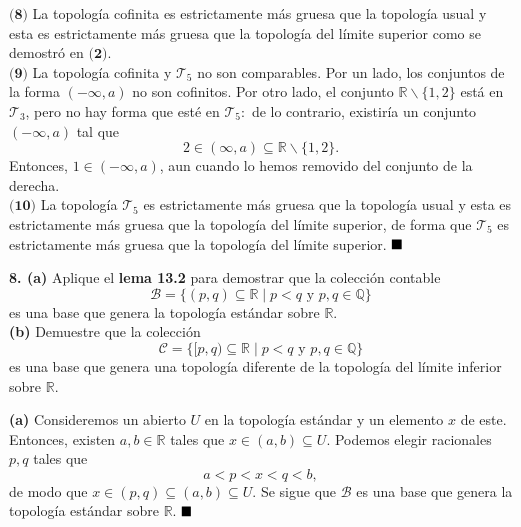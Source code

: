 \documentclass{article}
\begin{document}
$\textbf{(8)}$ La topología cofinita es estrictamente más gruesa que la topología usual y esta es estrictamente más gruesa que la topología del límite superior como se demostró en $\textbf{(2)}$.\\ 
\newpage
$\textbf{(9)}$ La topología cofinita y $\mathcal{T}_{5}$ no son comparables. Por un lado, los conjuntos de la forma $(- \infty, a)$ no son cofinitos. Por otro lado, el conjunto $\mathbb{R} \backslash \{ 1, 2\}$ está en $\mathcal{T}_{3}$, pero no hay forma que esté en $\mathcal{T}_{5}: $ de lo contrario, existiría un conjunto $(-\infty, a)$ tal que
$$  2 \in (\infty, a) \subseteq \mathbb{R} \backslash \{1, 2 \}.$$ 
Entonces, $1 \in (- \infty, a)$, aun cuando lo hemos removido del conjunto de la derecha. \\

$\textbf{(10)}$ La topología $\mathcal{T}_{5}$ es estrictamente más gruesa que la topología usual y esta es estrictamente más gruesa que la topología del límite superior, de forma que $\mathcal{T}_{5}$ es estrictamente más gruesa que la topología del límite superior. $\hspace*{\fill} \blacksquare$\\
 

\begin{mybox}
\textbf{8. (a)} Aplique el \textbf{lema 13.2} para demostrar que la colección contable 
$$ \mathcal{B} = \{ (p, q) \subseteq \mathbb{R} \mid p < q \text{ y } p, q \in \mathbb{Q} \} $$
es una base que genera la topología estándar sobre $\mathbb{R}$.	\\

\textbf{(b) }Demuestre que la colección 
$$ \mathcal{C} = \{ [p, q) \subseteq \mathbb{R} \mid p < q \text{ y }p, q \in \mathbb{Q} \} $$
es una base que genera una topología diferente de la topología del límite inferior sobre $\mathbb{R}$.
\end{mybox}	

\textbf{(a)} Consideremos un abierto $U$ en la topología estándar y un elemento $x$ de este. Entonces, existen $a, b \in \mathbb{R}$ tales que $x \in (a, b) \subseteq U$. Podemos elegir racionales $p, q$ tales que 
$$ a < p < x < q < b ,$$
de modo que $x \in (p, q) \subseteq (a, b ) \subseteq U.$ Se sigue que $\mathcal{B}$ es una base que genera la topología estándar sobre $\mathbb{R}$. $\hspace*{\fill} \blacksquare$\\
\end{document}
